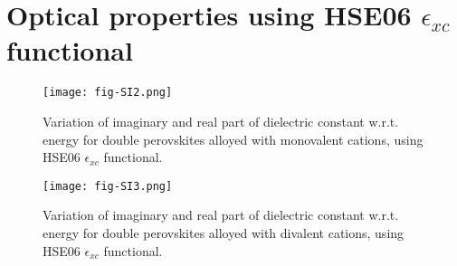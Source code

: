 \documentclass[journal=jpclcd,manuscript=letter]{achemso}
\begin{document}
\section{{Optical properties using HSE06 $\epsilon_{xc}$ functional}}
\begin{figure}[H]
	\centering
	\texttt{[image: fig-SI2.png]}
	\caption{Variation of imaginary and real part of dielectric constant w.r.t. energy for double perovskites alloyed with monovalent cations, using HSE06 $\epsilon_{xc}$ functional.}
	\label{fig7}
\end{figure}

\begin{figure}[H]
	\centering
	\texttt{[image: fig-SI3.png]}
	\caption{Variation of imaginary and real part of dielectric constant w.r.t. energy for double perovskites alloyed with divalent cations, using HSE06 $\epsilon_{xc}$ functional.}
	\label{fig8}
\end{figure}
%
%
\providecommand{\latin}[1]{#1}
\makeatletter
\providecommand{\doi}
  {\begingroup\let\do\@makeother\dospecials
  \catcode`\{=1 \catcode`\}=2 \doi@aux}
\providecommand{\doi@aux}[1]{\endgroup\texttt{#1}}
\makeatother
\providecommand*\mcitethebibliography{\thebibliography}
\end{document}
